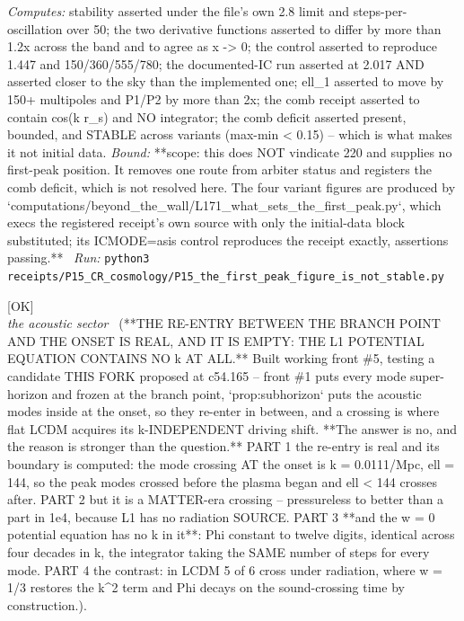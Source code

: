\begin{description}
\emph{Computes:} stability asserted under the file's own 2.8 limit and steps-per-oscillation over 50; the two derivative functions asserted to differ by more than 1.2x across the band and to agree as x -> 0; the control asserted to reproduce 1.447 and 150/360/555/780; the documented-IC run asserted at 2.017 AND asserted closer to the sky than the implemented one; ell\_1 asserted to move by 150+ multipoles and P1/P2 by more than 2x; the comb receipt asserted to contain cos(k r\_s) and NO integrator; the comb deficit asserted present, bounded, and STABLE across variants (max-min < 0.15) -- which is what makes it not initial data.
 \emph{Bound:} **scope: this does NOT vindicate 220 and supplies no first-peak position. It removes one route from arbiter status and registers the comb deficit, which is not resolved here. The four variant figures are produced by `computations/beyond\_the\_wall/L171\_what\_sets\_the\_first\_peak.py`, which execs the registered receipt's own source with only the initial-data block substituted; its ICMODE=asis control reproduces the receipt exactly, assertions passing.**
\ \emph{Run:} \texttt{python3 receipts/P15\_CR\_cosmology/P15\_the\_first\_peak\_figure\_is\_not\_stable.py}
\item[\label{rcpt:P15_the_crossing_exists_and_is_empty}\texttt{P15\_the\_crossing\_exists\_and\_is\_empty}]\hfill\textsf{[OK]}\\
\textit{the acoustic sector} \ (**THE RE-ENTRY BETWEEN THE BRANCH POINT AND THE ONSET IS REAL, AND IT IS EMPTY: THE L1 POTENTIAL EQUATION CONTAINS NO k AT ALL.** Built working front \#5, testing a candidate THIS FORK proposed at c54.165 -- front \#1 puts every mode super-horizon and frozen at the branch point, `prop:subhorizon` puts the acoustic modes inside at the onset, so they re-enter in between, and a crossing is where flat LCDM acquires its k-INDEPENDENT driving shift. **The answer is no, and the reason is stronger than the question.** PART 1 the re-entry is real and its boundary is computed: the mode crossing AT the onset is k = 0.0111/Mpc, ell = 144, so the peak modes crossed before the plasma began and ell < 144 crosses after. PART 2 but it is a MATTER-era crossing -- pressureless to better than a part in 1e4, because L1 has no radiation SOURCE. PART 3 **and the w = 0 potential equation has no k in it**: Phi constant to twelve digits, identical across four decades in k, the integrator taking the SAME number of steps for every mode. PART 4 the contrast: in LCDM 5 of 6 cross under radiation, where w = 1/3 restores the k\textasciicircum{}2 term and Phi decays on the sound-crossing time by construction.). 

\end{description}
